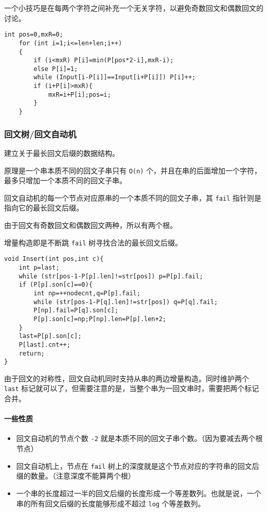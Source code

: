 \documentclass[UTF-8]{ctexart}
\begin{document}
	一个小技巧是在每两个字符之间补充一个无关字符，以避免奇数回文和偶数回文的讨论。
\begin{verbatim}
int pos=0,mxR=0;
    for (int i=1;i<=len+len;i++)
    {
        if (i<mxR) P[i]=min(P[pos*2-i],mxR-i);
        else P[i]=1;
        while (Input[i-P[i]]==Input[i+P[i]]) P[i]++;
        if (i+P[i]>mxR){
            mxR=i+P[i];pos=i;
        }
    }
\end{verbatim}
	
	\subsubsection{回文树/回文自动机}
	建立关于最长回文后缀的数据结构。
	
	原理是一个串本质不同的回文子串只有 \texttt{O(n)} 个，并且在串的后面增加一个字符，最多只增加一个本质不同的回文子串。
	
	回文自动机的每一个节点对应原串的一个本质不同的回文子串，其 \texttt{fail} 指针则是指向它的最长回文后缀。
	
	由于回文有奇数回文和偶数回文两种，所以有两个根。
	
	增量构造即是不断跳 \texttt{fail} 树寻找合法的最长回文后缀。
	
\begin{verbatim}
void Insert(int pos,int c){
    int p=last;
    while (str[pos-1-P[p].len]!=str[pos]) p=P[p].fail;
    if (P[p].son[c]==0){
        int np=++nodecnt,q=P[p].fail;
        while (str[pos-1-P[q].len]!=str[pos]) q=P[q].fail;
        P[np].fail=P[q].son[c];
        P[p].son[c]=np;P[np].len=P[p].len+2;
    }
    last=P[p].son[c];
    P[last].cnt++;
    return;
}
\end{verbatim}

	由于回文的对称性，回文自动机同时支持从串的两边增量构造。同时维护两个 \texttt{last} 标记就可以了，但需要注意的是，当整个串为一回文串时，需要把两个标记合并。
	
	\paragraph{一些性质}
	\begin{itemize}
		\item 回文自动机的节点个数 \texttt{-2} 就是本质不同的回文子串个数。（因为要减去两个根节点）
		\item 回文自动机上，节点在 \texttt{fail} 树上的深度就是这个节点对应的字符串的回文后缀的数量。（注意深度不能算两个根）
		\item 一个串的长度超过一半的回文后缀的长度形成一个等差数列。也就是说，一个串的所有回文后缀的长度能够形成不超过 \texttt{log} 个等差数列。
	\end{itemize}
	
\end{document}
